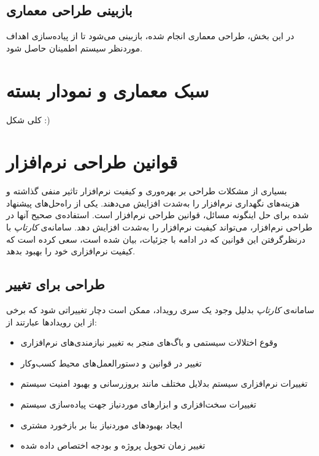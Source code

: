 \subsection{بازبینی طراحی معماری}
در این بخش، طراحی معماری انجام شده، بازبینی می‌شود تا از پیاده‌سازی اهداف موردنظر سیستم اطمینان حاصل شود.

\section{سبک‌ معماری و نمودار بسته}
کلی شکل :)

\section{قوانین طراحی نرم‌افزار}
بسیاری از مشکلات طراحی بر بهره‌وری و کیفیت نرم‌افزار تاثیر منفی گذاشته و هزینه‌های نگهداری نرم‌افزار را به‌شدت افزایش می‌دهند. یکی از راه‌حل‌های پیشنهاد شده برای حل اینگونه مسائل، قوانین طراحی نرم‌افزار است. استفاده‌ی صحیح آنها در طراحی نرم‌افزار، می‌تواند کیفیت نرم‌افزار را به‌شدت افزایش دهد. سامانه‌ی \textit{کارتاپ} با درنظرگرفتن این قوانین که در ادامه با جزئیات، بیان شده است، سعی کرده است که کیفیت نرم‌افزاری خود را بهبود بدهد.

\subsection{طراحی برای تغییر}
سامانه‌ی \textit{کارتاپ} بدلیل وجود یک سری رویداد، ممکن است دچار تغییراتی شود که برخی از این رویداد‌ها عبارتند از:

\begin{itemize}
	\item 
	وقوع اختلالات سیستمی و باگ‌های منجر به تغییر نیاز‌مندی‌های نرم‌افزاری
	
	\item 
	تغییر در قوانین و دستور‌العمل‌های محیط کسب‌وکار
	
	\item 
	تغییرات نرم‌افزاری سیستم بدلایل مختلف مانند بروزرسانی و بهبود امنیت سیستم
	
	\item 
	تغییرات سخت‌افزاری و ابزار‌های موردنیاز جهت پیاده‌سازی سیستم
	
	\item 
	ایجاد بهبود‌های موردنیاز‌ بنا بر بازخورد مشتری
	
	\item 
	تغییر زمان تحویل پروژه و بودجه اختصاص داده شده
\end{itemize}

